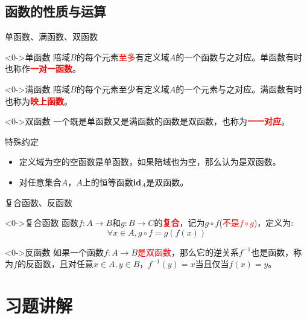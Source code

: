 \documentclass[10pt,aspectratio=43,mathserif,table]{beamer}
\begin{document}
\subsection{函数的性质与运算}

\begin{frame}{单函数、满函数、双函数}
	\begin{block}<0->{单函数}
		陪域$B$的每个元素\textcolor{red}{至多}有定义域$A$的一个函数与之对应。单函数有时也称作\textcolor{red}{\textbf{一对一函数}}。
	\end{block}
	
	\begin{block}<0->{满函数}
		陪域$B$的每个元素至少有定义域$A$的一个元素与之对应。满函数有时也称为\textcolor{red}{\textbf{映上函数}}。
	\end{block}
	
	\begin{block}<0->{双函数}
		一个既是单函数又是满函数的函数是双函数，也称为\textcolor{red}{\textbf{一一对应}}。
	\end{block}
\end{frame}

\begin{frame}{特殊约定}
	\begin{itemize}
		\item<0-> 定义域为空的空函数是单函数，如果陪域也为空，那么认为是双函数。
		\item<0-> 对任意集合$A$，$A$上的恒等函数\textbf{id}$_{A}$是双函数。
	\end{itemize}
\end{frame}

\begin{frame}{复合函数、反函数}
	\begin{block}<0->{复合函数}
		函数$f:A\rightarrow B$和$g:B\rightarrow C$的\textcolor{red}{\textbf{复合}}，记为$g\circ f$\;(\textcolor{red}{不是$f\circ g$})，定义为:$$\forall x\in A,g\circ f = g(f(x))$$
	\end{block}

	\begin{block}<0->{反函数}
		如果一个函数$f:A\rightarrow B$\textcolor{red}{是双函数}，那么它的逆关系$f^{-1}$也是函数，称为$f$的反函数，且对任意$x\in A,y\in B$，$f^{-1}(y)=x$当且仅当$f(x)=y$。
	\end{block}
\end{frame}

\section{习题讲解}
\end{document}
